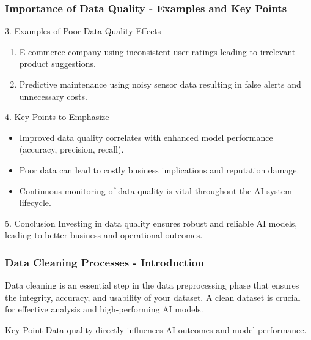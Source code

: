 \documentclass[aspectratio=169]{beamer}
\begin{document}
\begin{frame}[fragile]
    \frametitle{Importance of Data Quality - Examples and Key Points}

    \begin{block}{3. Examples of Poor Data Quality Effects}
        \begin{enumerate}
            \item E-commerce company using inconsistent user ratings leading to irrelevant product suggestions.
            \item Predictive maintenance using noisy sensor data resulting in false alerts and unnecessary costs.
        \end{enumerate}
    \end{block}

    \begin{block}{4. Key Points to Emphasize}
        \begin{itemize}
            \item Improved data quality correlates with enhanced model performance (accuracy, precision, recall).
            \item Poor data can lead to costly business implications and reputation damage.
            \item Continuous monitoring of data quality is vital throughout the AI system lifecycle.
        \end{itemize}
    \end{block}

    \begin{block}{5. Conclusion}
        Investing in data quality ensures robust and reliable AI models, leading to better business and operational outcomes.
    \end{block}
\end{frame}

\begin{frame}[fragile]
  \frametitle{Data Cleaning Processes - Introduction}
  Data cleaning is an essential step in the data preprocessing phase that ensures the integrity, accuracy, and usability of your dataset. A clean dataset is crucial for effective analysis and high-performing AI models.
  
  \begin{block}{Key Point}
    Data quality directly influences AI outcomes and model performance.
  \end{block}
\end{frame}
\end{document}
